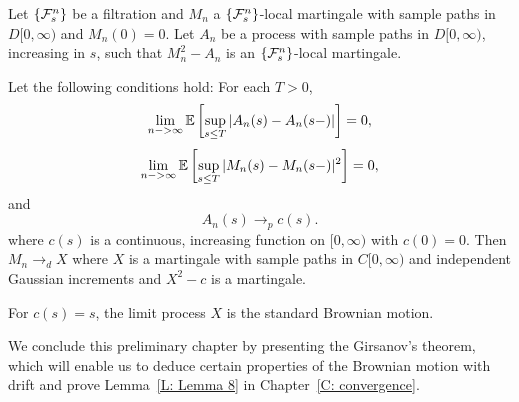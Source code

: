 \begin{theorem} \label{T: functional CLT martingales}
	Let $\{\mathcal{F}^n_{s}\}$ be a filtration and $M_n$ a $\{\mathcal{F}^n_{s}\}$-local martingale with sample paths in $D[0,\infty)$ and $M_n(0)=0$.
	Let $A_n$ be a process with sample paths in $D[0,\infty)$, increasing in $s$, such that $M_n^2 - A_n$ is an $\{\mathcal{F}^n_{s}\}$-local martingale.
	
	Let the following conditions hold:
	For each $T>0$,
	\begin{equation} \label{E: cond1 CLT}
	\lim_{n->\infty} \mathbb{E} \left[ 
		\sup_{s \leq T} | A_n(s) - A_n(s-)|
	 \right] = 0,
	\end{equation}
	\begin{equation} \label{E: cond2 CLT}
	\lim_{n->\infty} \mathbb{E} \left[ 
		\sup_{s \leq T} | M_n(s) - M_n(s-)|^2
	 \right] = 0,
	\end{equation}
	and 
	\begin{equation} \label{E: cond3 CLT}
	A_n(s) \longrightarrow_p c(s).
	\end{equation}
	where $c(s)$ is a continuous, increasing function on $[0, \infty)$ with $c(0) = 0$.
	Then $M_n \longrightarrow_d X$ where $X$ is a martingale with sample paths in $C[0,\infty)$ and independent Gaussian increments
	and $X^2 - c$ is a martingale.
\end{theorem}

For $c(s) = s$, the limit process $X$ is the standard Brownian motion.

We conclude this preliminary chapter by presenting the Girsanov's theorem,
which will enable us to deduce certain properties of the Brownian motion with drift
and prove Lemma~\ref{L: Lemma 8} in Chapter~\ref{C: convergence}.


